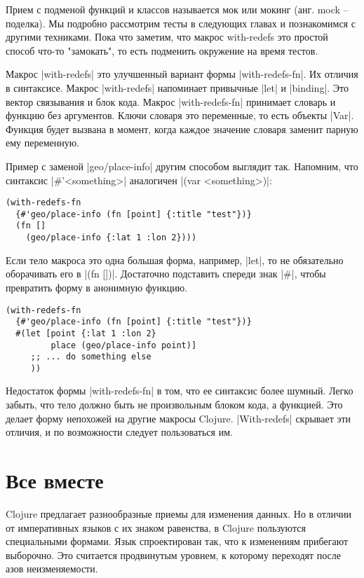 {{{{{{{{Прием с подменой функций и классов называется мок или мокинг (анг. mock --
поделка). Мы подробно рассмотрим тесты в следующих главах и познакомимся с
другими техниками. Пока что заметим, что макрос with-redefs это простой способ
что-то "замокать", то есть подменить окружение на время тестов.

Макрос \spverb|with-redefs| это улучшенный вариант формы \spverb|with-redefs-fn|. Их отличия в
синтаксисе. Макрос \spverb|with-redefs| напоминает привычные \spverb|let| и \spverb|binding|. Это
вектор связывания и блок кода. Макрос \spverb|with-redefs-fn| принимает словарь и
функцию без аргументов. Ключи словаря это переменные, то есть объекты
\spverb|Var|. Функция будет вызвана в момент, когда каждое значение словаря заменит
парную ему переменную.

Пример с заменой \spverb|geo/place-info| другим способом выглядит так. Напомним, что
синтаксис \spverb|#'<something>| аналогичен \spverb|(var <something>)|:

\begin{verbatim}
(with-redefs-fn
  {#'geo/place-info (fn [point] {:title "test"})}
  (fn []
    (geo/place-info {:lat 1 :lon 2})))
\end{verbatim}

Если тело макроса это одна большая форма, например, \spverb|let|, то не обязательно
оборачивать его в \spverb|(fn [])|. Достаточно подставить спереди знак \spverb|#|, чтобы
превратить форму в анонимную функцию.

\begin{verbatim}
(with-redefs-fn
  {#'geo/place-info (fn [point] {:title "test"})}
  #(let [point {:lat 1 :lon 2}
         place (geo/place-info point)]
     ;; ... do something else
     ))
\end{verbatim}

Недостаток формы \spverb|with-redefs-fn| в том, что ее синтаксис более шумный. Легко
забыть, что тело должно быть не произвольным блоком кода, а функцией. Это делает
форму непохожей на другие макросы Clojure. \spverb|With-redefs| скрывает эти отличия, и
по возможности следует пользоваться им.

\section{Все вместе}

Clojure предлагает разнообразные приемы для изменения данных. Но в отличии от
императивных языков с их знаком равенства, в Clojure пользуются специальными
формами. Язык спроектирован так, что к изменениям прибегают выборочно. Это
считается продвинутым уровнем, к которому переходят после азов неизменяемости.

}}}}}}}}
